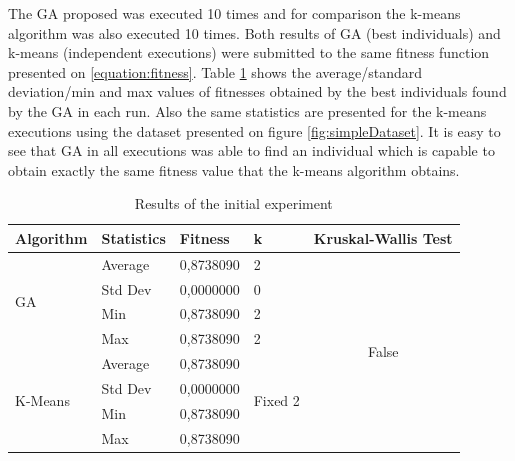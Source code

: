 \documentclass[journal]{IEEEtran}
\begin{document}
The GA proposed was executed 10 times and for comparison the k-means algorithm was also executed 10 times. Both results of GA (best individuals) and k-means (independent executions) were submitted to the same fitness function presented on \ref{equation:fitness}. Table \ref{tab:resultsInitial}
shows the average/standard deviation/min and max values of fitnesses obtained by the best individuals found by the GA in each run. Also the same statistics are presented for the k-means executions using the dataset presented on figure \ref{fig:simpleDataset}.
It is easy to see that GA in all executions was able to find an individual which is capable to obtain exactly the same fitness value that the k-means algorithm obtains. 

\begin{table}[]
	\centering
	\caption{Results of the initial experiment}
	\label{tab:resultsInitial}
	\begin{tabular}{|l|l|l|l|c|}
		\hline
		Algorithm                & Statistics & Fitness   & k                                             & \multicolumn{1}{l|}{Kruskal-Wallis Test} \\ \hline
		\multirow{4}{*}{GA}      & Average    & 0,8738090 & 2                                             & \multirow{8}{*}{False}                   \\ \cline{2-4}
		& Std Dev    & 0,0000000 & 0                                             &                                          \\ \cline{2-4}
		& Min        & 0,8738090 & 2                                             &                                          \\ \cline{2-4}
		& Max        & 0,8738090 & 2                                             &                                          \\ \cline{1-4}
		\multirow{4}{*}{K-Means} & Average    & 0,8738090 & \multicolumn{1}{c|}{\multirow{4}{*}{Fixed 2}} &                                          \\ \cline{2-3}
		& Std Dev    & 0,0000000 & \multicolumn{1}{c|}{}                         &                                          \\ \cline{2-3}
		& Min        & 0,8738090 & \multicolumn{1}{c|}{}                         &                                          \\ \cline{2-3}
		& Max        & 0,8738090 & \multicolumn{1}{c|}{}                         &                                          \\ \hline
	\end{tabular}
\end{table}
\end{document}
